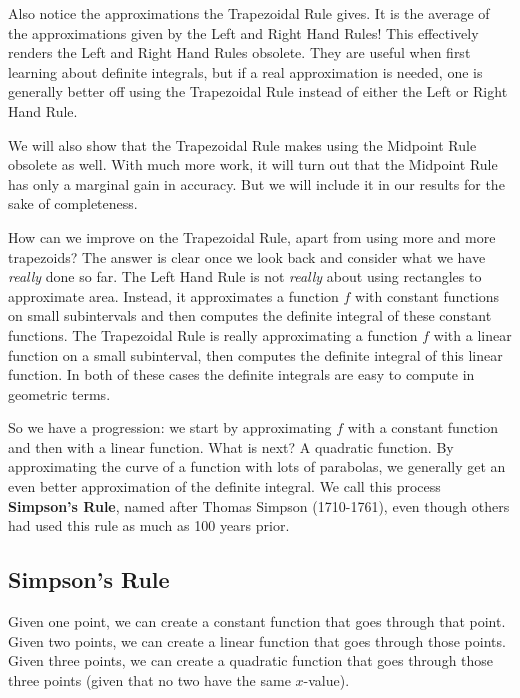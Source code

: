 Also notice the  approximations the Trapezoidal Rule gives. It is  the average of the approximations given by the Left and Right Hand Rules! This effectively renders the Left and Right Hand Rules obsolete. They are useful when first learning about definite integrals, but if a real approximation is needed, one is generally better off using the Trapezoidal Rule instead of either the Left or Right Hand Rule.

We will also show that the Trapezoidal Rule makes using the Midpoint Rule obsolete as well.  With much more work, it will turn out that the Midpoint Rule has only a marginal gain in accuracy.  But we will include it in our results for the sake of completeness.\bigskip

How can we improve on the Trapezoidal Rule, apart from using more and more trapezoids? The answer is clear once we look back and consider what we have \textit{really} done so far. The Left Hand Rule is not \textit{really} about using rectangles to approximate area. Instead, it approximates a function $f$ with constant functions on small subintervals and then computes the definite integral of these constant functions. The Trapezoidal Rule is really approximating a function $f$ with a linear function on a small subinterval, then computes the definite integral of this linear function. In both of these cases the definite integrals are easy to compute in geometric terms.

So we have a progression: we start by approximating $f$ with a constant function and then with a linear function. What is next? A quadratic function. By approximating the curve of a function with lots of parabolas, we generally get an even better approximation of the definite integral. We call this process \textbf{Simpson's Rule}, named after Thomas Simpson (1710-1761), even though others had used this rule as much as 100 years prior.

\subsection{Simpson's Rule}

Given one point, we can create a constant function that goes through that point. Given two points, we can create a linear function that goes through those points. Given three points, we can create a quadratic function that goes through those three points (given that no two have the same $x$-value).

